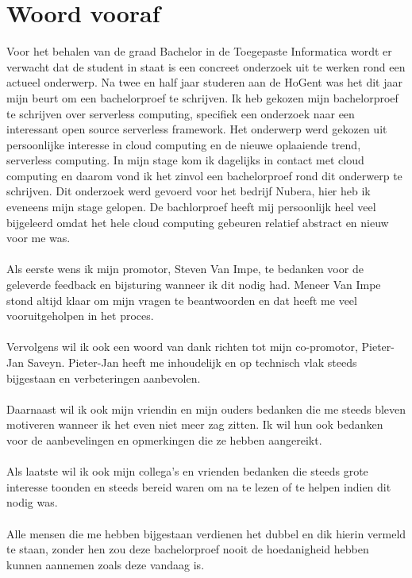 
\chapter*{Woord vooraf}
\label{ch:voorwoord}

Voor het behalen van de graad Bachelor in de Toegepaste Informatica wordt er verwacht dat de student in staat is een concreet onderzoek uit te werken rond een actueel onderwerp. Na twee en half jaar studeren aan de HoGent was het dit jaar mijn beurt om een bachelorproef te schrijven. Ik heb gekozen mijn bachelorproef te schrijven over serverless computing, specifiek een onderzoek naar een interessant open source serverless framework. Het onderwerp werd gekozen uit persoonlijke interesse in cloud computing en de nieuwe oplaaiende trend, serverless computing. In mijn stage kom ik dagelijks in contact met cloud computing en daarom vond ik het zinvol een bachelorproef rond dit onderwerp te schrijven. Dit onderzoek werd gevoerd voor het bedrijf Nubera, hier heb ik eveneens mijn stage gelopen. De bachlorproef heeft mij persoonlijk heel veel bijgeleerd omdat het hele cloud computing gebeuren relatief abstract en nieuw voor me was. 
\\\\
Als eerste wens ik mijn promotor, Steven Van Impe, te bedanken voor de geleverde feedback en bijsturing wanneer ik dit nodig had. Meneer Van Impe stond altijd klaar om mijn vragen te beantwoorden en dat heeft me veel vooruitgeholpen in het proces.
\\\\
Vervolgens wil ik ook een woord van dank richten tot mijn co-promotor, Pieter-Jan Saveyn. Pieter-Jan heeft me inhoudelijk en op technisch vlak steeds bijgestaan en verbeteringen aanbevolen.
\\\\
Daarnaast wil ik ook mijn vriendin en mijn ouders bedanken die me steeds bleven motiveren wanneer ik het even niet meer zag zitten. Ik wil hun ook bedanken voor de aanbevelingen en opmerkingen die ze hebben aangereikt.
\\\\
Als laatste wil ik ook mijn collega's en vrienden bedanken die steeds grote interesse toonden en steeds bereid waren om na te lezen of te helpen indien dit nodig was.
\\\\
Alle mensen die me hebben bijgestaan verdienen het dubbel en dik hierin vermeld te staan, zonder hen zou deze bachelorproef nooit de hoedanigheid hebben kunnen aannemen zoals deze vandaag is.
